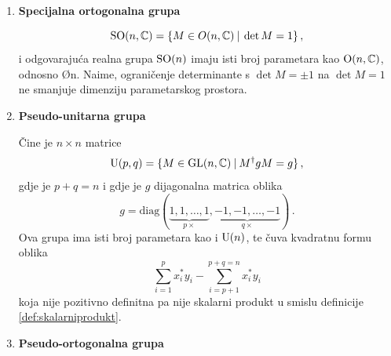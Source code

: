 \begin{enumerate}[leftmargin=0pt, itemindent=0pt]
U fizici se najčešće susrećemo s grupom ortogonalnih \emph{realnih} matrica
\begin{equation}
\O{n} \equiv \O{n, \mathbb{R}} = \{ M\in \GL{n,\mathbb{R}} \td M M^{\mathrm{T}} = 1\} \,,
\end{equation}
koja ima $n(n-1)/2$ parametara. Ova grupa čuva
kvadratnu formu $(\vec{x}, \vec{y}) = \sum_i x_i y_i$ tj. skalarni produkt na realnom
vektorskom prostoru, što se može upotrijebiti kao alternativna definicija grupe.
Uvjet ortogonalnosti $M M^{\mathrm{T}} = 1$ vodi na $(\det M)^2 = 1$, odnosno
na zaključak da ortogonalne matrice imaju determinantu $\det M = \pm 1$.
Kao posljedica \O{n} ima dvije komponente povezanosti.

\item \textbf{Specijalna ortogonalna grupa}

\begin{equation}
\mathrm{SO}(n, \mathbb{C}) = \{ M\in O(n, \mathbb{C}) \: | \: \det M  = 1\} \,,
\end{equation}
i odgovarajuća realna grupa $\mathrm{SO}(n)$ imaju isti broj parametara kao
$\mathrm{O}(n, \mathbb{C})$, odnosno \O{n}. Naime, ograničenje determinante
s $\det M = \pm 1$
na $\det M = 1$ ne smanjuje dimenziju parametarskog prostora.

\item \textbf{Pseudo-unitarna grupa}

Čine je $n\times n$ matrice
\begin{equation}
\mathrm{U}(p, q) = \{ M\in \mathrm{GL}(n,\mathbb{C}) \: | \: M^{\dagger} g M = g\} \,,
\end{equation}
gdje je $p+q=n$ i gdje je $g$ dijagonalna matrica oblika
\begin{equation}
  g = \mathrm{diag}(\underbrace{1, 1, \dots, 1}_{p \times},
\underbrace{-1, -1, \dots, -1}_{q \times}) \,.
\label{eq:metricg}
\end{equation}
Ova grupa ima isti broj parametara kao i $\mathrm{U}(n)$, te
čuva kvadratnu formu oblika
\begin{equation}
 \sum_{i=1}^{p} x_{i}^* y_{i} - \sum_{i=p+1}^{p+q=n} x_{i}^* y_i 
\end{equation}
koja nije pozitivno definitna pa nije skalarni produkt u smislu
definicije \ref{def:skalarniprodukt}.


\item \textbf{Pseudo-ortogonalna grupa}


\end{enumerate}
